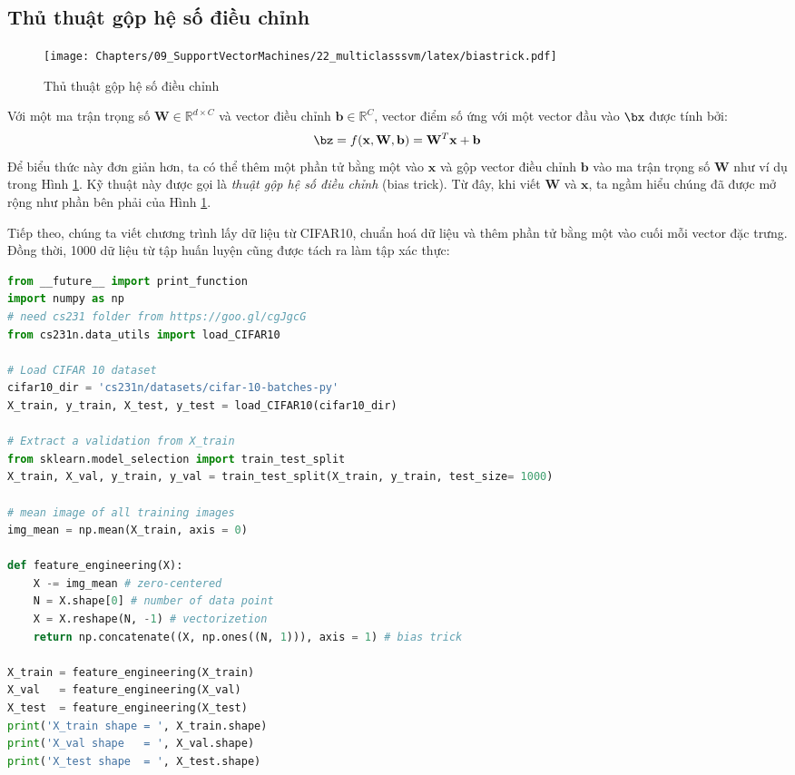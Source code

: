 \subsection{Thủ thuật gộp hệ số điều chỉnh}
\begin{figure}[t]
    \centering
        \texttt{[image: Chapters/09\_SupportVectorMachines/22\_multiclasssvm/latex/biastrick.pdf]}
        \caption[]{Thủ thuật gộp hệ số điều chỉnh}
        \label{fig:22_3}
    \end{figure} 

Với một ma trận trọng số $\mathbf{W} \in \mathbb{R}^{d\times C}$ và vector điều chỉnh $\mathbf{b} \in \mathbb{R}^C$, vector điểm số ứng với một vector đầu vào $\bx$ được tính bởi:
\begin{equation} 
\bz = f(\mathbf{x}, \mathbf{W}, \mathbf{b}) = \mathbf{W}^T\mathbf{x} + \mathbf{b} 
\end{equation} 
Để biểu thức này đơn giản hơn, ta có thể thêm một phần tử bằng một vào $\mathbf{x}$ và {gộp} vector điều chỉnh $\mathbf{b}$ vào ma trận trọng số $\mathbf{W}$
như ví dụ trong Hình \ref{fig:22_3}. Kỹ thuật này được gọi là \textit{thuật gộp hệ số điều chỉnh} (bias trick). Từ đây, khi viết
$\mathbf{W}$ và $\mathbf{x}$, ta ngầm hiểu chúng đã được mở rộng như
phần bên phải của Hình \ref{fig:22_3}.

Tiếp theo, chúng ta viết chương trình lấy dữ liệu từ CIFAR10, chuẩn hoá dữ
liệu và thêm phần tử bằng một vào cuối mỗi vector đặc trưng. Đồng thời, 1000 dữ liệu từ tập huấn luyện cũng được tách ra làm tập xác thực:

\begin{lstlisting}[language=Python]
from __future__ import print_function 
import numpy as np
# need cs231 folder from https://goo.gl/cgJgcG
from cs231n.data_utils import load_CIFAR10 

# Load CIFAR 10 dataset
cifar10_dir = 'cs231n/datasets/cifar-10-batches-py'
X_train, y_train, X_test, y_test = load_CIFAR10(cifar10_dir)

# Extract a validation from X_train 
from sklearn.model_selection import train_test_split
X_train, X_val, y_train, y_val = train_test_split(X_train, y_train, test_size= 1000)

# mean image of all training images
img_mean = np.mean(X_train, axis = 0)

def feature_engineering(X):
    X -= img_mean # zero-centered
    N = X.shape[0] # number of data point 
    X = X.reshape(N, -1) # vectorizetion 
    return np.concatenate((X, np.ones((N, 1))), axis = 1) # bias trick 

X_train = feature_engineering(X_train)
X_val   = feature_engineering(X_val)
X_test  = feature_engineering(X_test)
print('X_train shape = ', X_train.shape)
print('X_val shape   = ', X_val.shape)
print('X_test shape  = ', X_test.shape)
\end{lstlisting}

